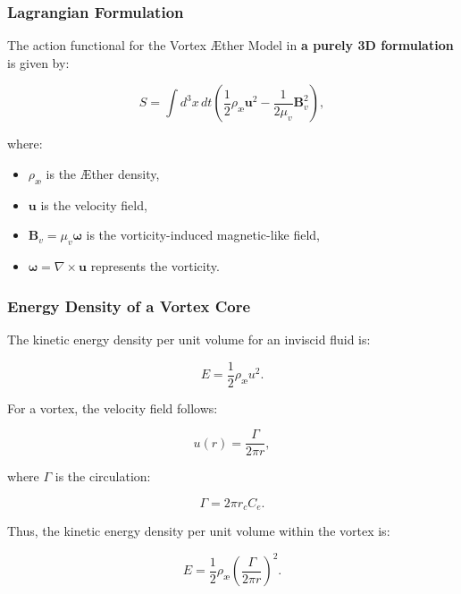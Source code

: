 \documentclass[a4paper,10pt]{article}
\begin{document}
\subsubsection*{Lagrangian Formulation}
The action functional for the Vortex Æther Model in \textbf{a purely 3D formulation} is given by:

\begin{equation*}
    S = \int d^3x \, dt \left( \frac{1}{2} \rho_\text{\ae} \mathbf{u}^2 - \frac{1}{2 \mu_v} \mathbf{B}_v^2 \right),
\end{equation*}

where:
\begin{itemize}
    \item \( \rho_\text{\ae} \) is the Æther density,
    \item \( \mathbf{u} \) is the velocity field,
    \item \( \mathbf{B}_v = \mu_v \boldsymbol{\omega} \) is the vorticity-induced magnetic-like field,
    \item \( \boldsymbol{\omega} = \nabla \times \mathbf{u} \) represents the vorticity.
\end{itemize}

\subsubsection*{Energy Density of a Vortex Core}
The kinetic energy density per unit volume for an inviscid fluid is:

\begin{equation*}
    E = \frac{1}{2} \rho_\text{\ae} u^2.
\end{equation*}

For a vortex, the velocity field follows:

\begin{equation*}
    u(r) = \frac{\Gamma}{2\pi r},
\end{equation*}

where \( \Gamma \) is the circulation:

\begin{equation*}
    \Gamma = 2\pi r_c C_e.
\end{equation*}

Thus, the kinetic energy density per unit volume within the vortex is:

\begin{equation*}
    E = \frac{1}{2} \rho_\text{\ae} \left( \frac{\Gamma}{2\pi r} \right)^2.
\end{equation*}
\end{document}
